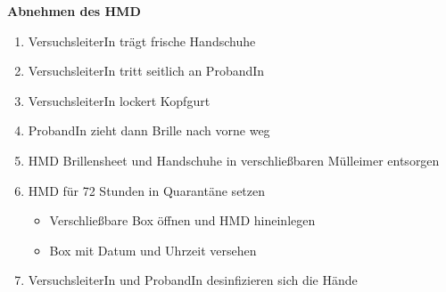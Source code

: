 \documentclass[24pt, a4paper, portrait]{article}
\begin{document}
\vspace{0.5cm}

\Large
\textbf{Abnehmen des HMD}

\large

\begin{enumerate}
    \item VersuchsleiterIn trägt frische Handschuhe
    \item VersuchsleiterIn tritt seitlich an ProbandIn
    \item VersuchsleiterIn lockert Kopfgurt
    \item ProbandIn zieht dann Brille nach vorne weg
    \item HMD Brillensheet und Handschuhe in verschließbaren Mülleimer entsorgen
    \item HMD für 72 Stunden in Quarantäne setzen
    \begin{itemize}
        \item Verschließbare Box öffnen und HMD hineinlegen
        \item Box mit Datum und Uhrzeit versehen
    \end{itemize}
    \item VersuchsleiterIn und ProbandIn desinfizieren sich die Hände
\end{enumerate}
\end{document}
